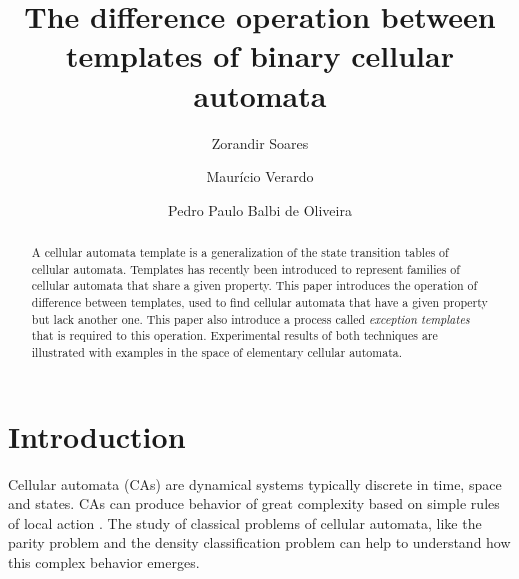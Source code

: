 \documentclass{llncs}
\begin{document}
\pagestyle{headings}  %

\title{The difference operation between templates of binary cellular automata}


\author{Zorandir Soares \and Maurício Verardo \and
Pedro Paulo Balbi de Oliveira}




\maketitle              %

\begin{abstract}
A cellular automata template is a generalization of the state transition tables of cellular automata. Templates has recently been introduced to represent families of cellular automata that share a given property. This paper introduces the operation of difference between templates, used to find cellular automata that have a given property but lack another one. This paper also introduce a process called \textit{exception templates} that is required to this operation. Experimental results of both techniques are illustrated with examples in the space of elementary cellular automata.
\end{abstract}
%
\section{Introduction}
\label{sec:introducao}
Cellular automata (CAs) are dynamical systems typically discrete in time, space and states.
CAs can produce behavior of great complexity based on simple rules of local action \cite{wolfram2002}. The study of classical problems of cellular automata, like the parity problem \cite{Betel2013} and the density classification problem \cite{deOliveira2014density} can help to understand how this complex behavior emerges.
\end{document}
